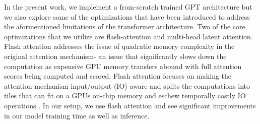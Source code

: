 In the present work, we implement a from-scratch trained GPT architecture but we also explore some of the 
optimizations that have been introduced to address the aformentioned limitations of the transformer architecture. 
Two of the core optimizations that we utilize are flash-attention and multi-head latent attention. Flash attention  addresses
the issue of quadratic memory complexity in the original attention mechanism- an issue that significantly slows down 
the computation as expensive GPU memory transfers abound with full attention scores being computed and scored. 
Flash attention focuses on making the attention mechanism input/output (IO) aware and splits the computations 
into tiles that can fit on a GPUs on-chip memory and eschew temporally costly IO operations \cite{dao2022flashattentionfastmemoryefficientexact}.
 In our setup, we use flash attention and see significant improvements in our model training time as well as inference.
